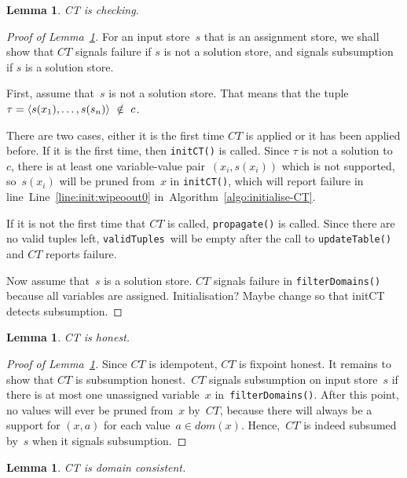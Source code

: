 \documentclass[a4paper,11pt]{article}
\newtheorem{lemma}[theorem]{Lemma}
\newcommand{\T}[1]{\texttt{#1}}
\newcommand{\Todo}[1]{{\color{blue}#1}}
\newcommand{\Algoref}[1]{Algorithm~\ref{#1}}
\newcommand{\Lineref}[1]{Line~\ref{#1}}
\newcommand{\Lemmaref}[1]{Lemma~\ref{#1}}
\newcommand{\CurrTable}{\texttt{validTuples}}
\numberwithin{equation}{section}
\begin{document}
\begin{lemma}\label{lemma:checking}
  CT is checking.
\end{lemma}

\begin{proof}[Proof of \Lemmaref{lemma:checking}]
  For an input store~$s$ that is an assignment store, we shall show that $CT$
  signals failure if $s$ is not a solution store, and signals subsumption if
  $s$ is a solution store. 

  First, assume that~$s$ is not a solution store. That means that the tuple
  $\tau = \left\langle s(x_1),\ldots,s(s_n)\right\rangle~\notin~c$.
 
  There are two cases, either
  it is the first time $CT$ is applied or it has been applied before.
  If it is the first time, then \T{initCT()} is called.
  Since $\tau$ is not a solution to~$c$, there is at least one variable-value
  pair~$(x_i,s(x_i))$ which is not supported, so~$s(x_i)$ will be pruned
  from~$x$ in \T{initCT()}, which will report failure in line~\Lineref{line:init:wipeoout0}
  in~\Algoref{algo:initialise-CT}.
  
  If it is not the first time that $CT$ is called, \T{propagate()} is called.
  Since there are no valid tuples left, \CurrTable~will be empty after
  the call to \T{updateTable()} and $CT$ reports failure.
  
  Now assume that~$s$ is a solution store. 
  $CT$ signals failure in \T{filterDomains()} because all variables are assigned.
  \Todo{Initialisation? Maybe change so that initCT detects subsumption.}
\end{proof}

\begin{lemma}\label{lemma:honest}
  CT is honest.
\end{lemma}

\begin{proof}[Proof of \Lemmaref{lemma:honest}]
  Since $CT$ is idempotent, $CT$ is fixpoint honest. It remains to show that
  $CT$ is subsumption honest.~$CT$ signals subsumption on input store~$s$
  if there is at most one
  unassigned variable~$x$ in~\T{filterDomains()}. After this point, no values will
  ever be pruned from~$x$ by~$CT$, because there will always be a support for
  $(x,a)$ for each value~$a \in dom(x)$. Hence,~$CT$ is indeed subsumed by~$s$
  when it signals subsumption.
    
\end{proof}

\begin{lemma}\label{lemma:domain-consistent}
  CT is domain consistent.
\end{lemma}
\end{document}

